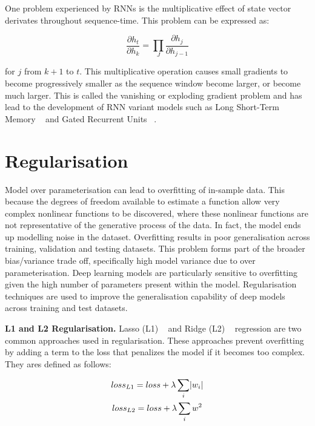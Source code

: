 One problem experienced by RNNs is the multiplicative effect of state vector derivates throughout sequence-time. This problem can be expressed as:

\begin{equation}
	\frac{\partial h_t} {\partial h_k} = \prod_J\frac{\partial h_j} {\partial h_{j-1}}
\end{equation}

for $j$ from $k + 1$ to $t$. This multiplicative operation causes small gradients to become progressively smaller as the sequence window become larger, or become much larger. This is called the vanishing or exploding gradient problem and has lead to the development of RNN variant models such as Long Short-Term Memory ~\citep{hochreiter1997long} and Gated Recurrent Units ~\citep{cho2014learning}.



\section{Regularisation}

Model over parameterisation can lead to overfitting of in-sample data. This because the degrees of freedom available to estimate a function allow very complex nonlinear functions to be discovered, where these nonlinear functions are not representative of the generative process of the data. In fact, the model ends up modelling noise in the dataset. Overfitting results in poor generalisation across training, validation and testing datasets. This problem forms part of the broader bias/variance trade off, specifically high model variance due to over parameterisation. Deep learning models are particularly sensitive to overfitting given the high number of parameters present within the model. Regularisation techniques are used to improve the generalisation capability of deep models across training and test datasets. \bigskip

\textbf{L1 and L2 Regularisation.} Lasso (L1) ~\citep{tibshirani1996regression} and Ridge (L2) ~\citep{hoerl1970ridge} regression are two common approaches used in regularisation. These approaches prevent overfitting by adding a term to the loss that penalizes the model if it becomes too complex. They ares defined as follows:

\begin{subequations}
	\begin{gather}
		loss_{L1} = loss + \lambda\sum_i\abs{w_i}  \\
		loss_{L2} = loss + \lambda\sum_iw^2
	\end{gather}
\end{subequations}

